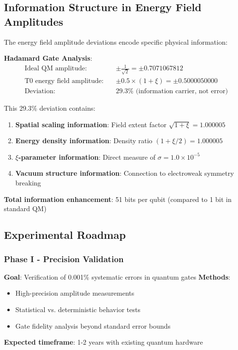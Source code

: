 	\subsection{Information Structure in Energy Field Amplitudes}
	
	The energy field amplitude deviations encode specific physical information:
	
	\textbf{Hadamard Gate Analysis}:
	\begin{align}
		\text{Ideal QM amplitude:} \quad &\pm \frac{1}{\sqrt{2}} = \pm 0.7071067812 \\
		\text{T0 energy field amplitude:} \quad &\pm 0.5 \times (1 + \xi) = \pm 0.5000050000 \\
		\text{Deviation:} \quad &29.3\% \text{ (information carrier, not error)}
	\end{align}
	
	This 29.3\% deviation contains:
	\begin{enumerate}
		\item \textbf{Spatial scaling information}: Field extent factor $\sqrt{1+\xi} = 1.000005$
		\item \textbf{Energy density information}: Density ratio $(1+\xi/2) = 1.000005$
		\item \textbf{$\xi$-parameter information}: Direct measure of $\sigma = 1.0 \times 10^{-5}$
		\item \textbf{Vacuum structure information}: Connection to electroweak symmetry breaking
	\end{enumerate}
	
	\textbf{Total information enhancement}: 51 bits per qubit (compared to 1 bit in standard QM)
	
	\subsection{Experimental Roadmap}
	
	\subsubsection{Phase I - Precision Validation}
	
	\textbf{Goal}: Verification of 0.001\% systematic errors in quantum gates
	\textbf{Methods}: 
	\begin{itemize}
		\item High-precision amplitude measurements
		\item Statistical vs. deterministic behavior tests
		\item Gate fidelity analysis beyond standard error bounds
	\end{itemize}
	\textbf{Expected timeframe}: 1-2 years with existing quantum hardware
	
